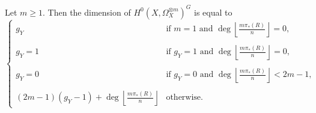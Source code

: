   \begin{prop}\label{dim}
    Let $m\geq 1$. Then the dimension of $H^0(X,\Omega_X^{\otimes m})^G$ is equal to
	\begin{equation*}
	   \begin{cases}
	    g_Y & \mbox{if } m=1 \mbox{ and } \deg\left\lfloor\frac{m\pi_*(R)}{n}\right\rfloor = 0, \\
\\
	    g_Y = 1 & \mbox{if } g_Y=1 \mbox{ and } \deg\left\lfloor\frac{m\pi_*(R)}{n}\right\rfloor = 0, \\ 
\\
	    g_Y = 0 & \mbox{if } g_Y=0 \mbox{ and } \deg\left\lfloor\frac{m\pi_*(R)}{n}\right\rfloor < 2m-1, \\
\\
	    (2m-1)(g_Y-1) + \deg\left\lfloor\frac{m\pi_*(R)}{n} \right\rfloor & \mbox{otherwise}.
	  \end{cases}
      \end{equation*}
  \end{prop}
